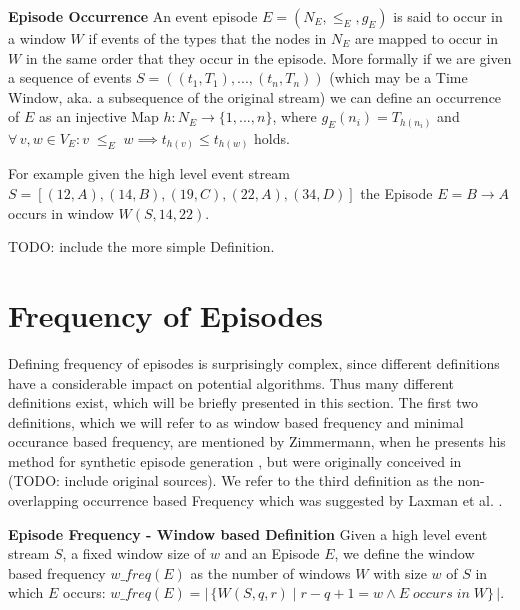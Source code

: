 \begin{mydef}
\textbf{Episode Occurrence} An event episode $E = (N_E,{\leq}_{E},g_E)$ is said to occur in a window $W$ if events of the types that the nodes in $N_E$ are mapped to occur in $W$ in the same order that they occur in the episode. More formally if we are given a sequence of events $S=((t_1,T_1),...,(t_n,T_n))$ (which may be a Time Window, aka. a subsequence of the original stream) we can define an occurrence of $E$ as an injective Map $h:N_E \rightarrow \{1,...,n\}$, where $g_E(n_i) = T_{h(n_i)}$ and $\forall \, v,w \in V_E : v \;{\leq}_{E}\; w \implies t_{h(v)} \leq t_{h(w)}$ holds.
\end{mydef}

For example given the high level event stream $S = [ (12,A) , (14,B) , (19,C) , (22,A), (34,D) ]$ the Episode $E = B \rightarrow A$ occurs in window $W(S,14,22)$. \newline \newline 

TODO: include the more simple Definition. \newline \newline


\section{Frequency of Episodes}
Defining frequency of episodes is surprisingly complex, since different definitions have a considerable impact on potential algorithms. Thus many different definitions exist, which will be briefly presented in this section. The first two definitions, which we will refer to as window based frequency and minimal occurance based frequency, are mentioned by Zimmermann, when he presents his method for synthetic episode generation \cite{zimmermann2012generating}, but were originally conceived in (TODO: include original sources). We refer to the third definition as the non-overlapping occurrence based Frequency which was suggested by Laxman et al. \cite{laxman2007fast}.
\begin{mydef}
\textbf{Episode Frequency - Window based Definition} Given a high level event stream $S$, a fixed window size of $w$ and an Episode $E$, we define the window based frequency $w\_freq(E)$ as the number of windows $W$ with size $w$ of $S$ in which $E$ occurs: $w\_freq(E) = |\,\{W(S,q,r) \mid r-q+1 = w \land E \;occurs\; in\; W \}\,|$.
\end{mydef}

